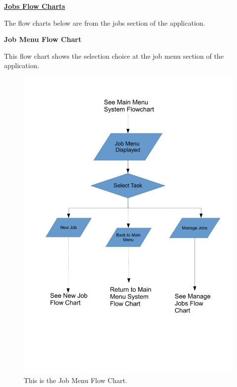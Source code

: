 \pagebreak
\underline{\textbf{Jobs Flow Charts}}
\begin{flushleft}
The flow charts below are from the jobs section of the application.
\end{flushleft}
\textbf{Job Menu Flow Chart}
\begin{flushleft}
This flow chart shows the selection choice at the job menu section of the application.
\end{flushleft}
\begin{figure}[H]
\includegraphics[scale=0.5]{./Design/images/FlowChartJobMenu.pdf}
    \caption{This is the Job Menu Flow Chart.} 
\label{fig:FlowChartJobMenu}
\end{figure}

